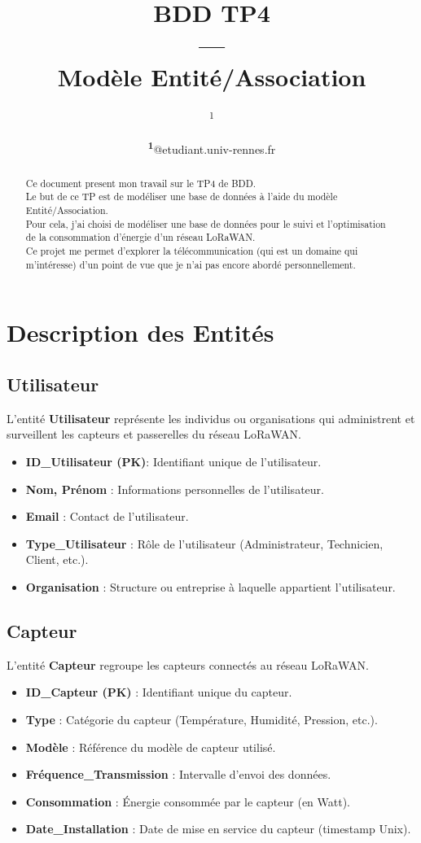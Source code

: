 \documentclass[
	a4paper, %
	11pt, %
	unnumberedsections, %
	twoside, %
    xcolor = {dvipsnames}
]{class}
\title{BDD TP4\\---\\Modèle Entité/Association} %
\author{%
	\censor{Alex Videcoq}\textsuperscript{1}
}
\date{\footnotesize\textsuperscript{\textbf{1}}\censor{alex.videcoq}@etudiant.univ-rennes.fr}
\begin{document}
\maketitle

\begin{abstract}
    \noindent Ce document present mon travail sur le TP4 de BDD.\\
    Le but de ce TP est de modéliser une base de données à l'aide du modèle Entité/Association.\\
    Pour cela, j'ai choisi de modéliser une base de données pour le suivi et l'optimisation de la consommation d'énergie d'un réseau LoRaWAN.\\
    Ce projet me permet d'explorer la télécommunication (qui est un domaine qui m'intéresse) d'un point de vue que je n'ai pas encore abordé personnellement.
\end{abstract}

\section{Description des Entités}
\subsection{Utilisateur}
L’entité \textbf{Utilisateur} représente les individus ou organisations qui administrent et surveillent les capteurs et passerelles du réseau LoRaWAN.
\begin{itemize}
    \item \textbf{ID\_Utilisateur (PK)}: Identifiant unique de l’utilisateur.
    \item \textbf{Nom, Prénom} : Informations personnelles de l’utilisateur.
    \item \textbf{Email} : Contact de l’utilisateur.
    \item \textbf{Type\_Utilisateur} : Rôle de l’utilisateur (Administrateur, Technicien, Client, etc.).
    \item \textbf{Organisation} : Structure ou entreprise à laquelle appartient l’utilisateur.
\end{itemize}

\subsection{Capteur}
L’entité \textbf{Capteur} regroupe les capteurs connectés au réseau LoRaWAN.
\begin{itemize}
    \item \textbf{ID\_Capteur (PK)} : Identifiant unique du capteur.
    \item \textbf{Type} : Catégorie du capteur (Température, Humidité, Pression, etc.).
    \item \textbf{Modèle} : Référence du modèle de capteur utilisé.
    \item \textbf{Fréquence\_Transmission} : Intervalle d’envoi des données.
    \item \textbf{Consommation} : \'Energie consommée par le capteur (en Watt).
    \item \textbf{Date\_Installation} : Date de mise en service du capteur (timestamp Unix).
\end{itemize}
\end{document}
